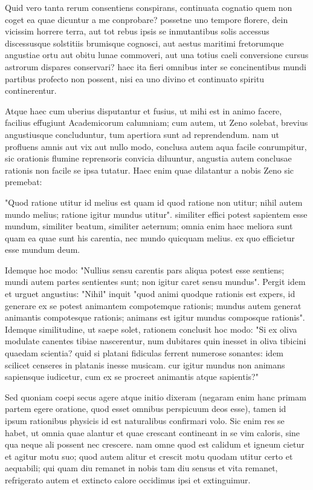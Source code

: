  Quid vero tanta rerum consentiens conspirans, continuata cognatio quem non coget ea quae dicuntur a me conprobare? possetne uno tempore florere, dein vicissim horrere terra, aut tot rebus ipsis se inmutantibus solis accessus discessusque solstitiis brumisque cognosci, aut aestus maritimi fretorumque angustiae ortu aut obitu lunae commoveri, aut una totius caeli conversione cursus astrorum dispares conservari? haec ita fieri omnibus inter se concinentibus mundi partibus profecto non possent, nisi ea uno divino et continuato spiritu continerentur.

 Atque haec cum uberius disputantur et fusius, ut mihi est in animo facere, facilius effugiunt Academicorum calumniam; cum autem, ut Zeno solebat, brevius angustiusque concluduntur, tum apertiora sunt ad reprendendum. nam ut profluens amnis aut vix aut nullo modo, conclusa autem aqua facile conrumpitur, sic orationis flumine reprensoris convicia diluuntur, angustia autem conclusae rationis non facile se ipsa tutatur. Haec enim quae dilatantur a nobis Zeno sic premebat:

 "Quod ratione utitur id melius est quam id quod ratione non utitur; nihil autem mundo melius; ratione igitur mundus utitur". similiter effici potest sapientem esse mundum, similiter beatum, similiter aeternum; omnia enim haec meliora sunt quam ea quae sunt his carentia, nec mundo quicquam melius. ex quo efficietur esse mundum deum.

 Idemque hoc modo: "Nullius sensu carentis pars aliqua potest esse sentiens; mundi autem partes sentientes sunt; non igitur caret sensu mundus". Pergit idem et urguet angustius: "Nihil" inquit "quod animi quodque rationis est expers, id generare ex se potest animantem compotemque rationis; mundus autem generat animantis compotesque rationis; animans est igitur mundus composque rationis". Idemque similitudine, ut saepe solet, rationem conclusit hoc modo: "Si ex oliva modulate canentes tibiae nascerentur, num dubitares quin inesset in oliva tibicini quaedam scientia? quid si platani fidiculas ferrent numerose sonantes: idem scilicet censeres in platanis inesse musicam. cur igitur mundus non animans sapiensque iudicetur, cum ex se procreet animantis atque sapientis?"

 Sed quoniam coepi secus agere atque initio dixeram (negaram enim hanc primam partem egere oratione, quod esset omnibus perspicuum deos esse), tamen id ipsum rationibus physicis id est naturalibus confirmari volo. Sic enim res se habet, ut omnia quae alantur et quae crescant contineant in se vim caloris, sine qua neque ali possent nec crescere. nam omne quod est calidum et igneum cietur et agitur motu suo; quod autem alitur et crescit motu quodam utitur certo et aequabili; qui quam diu remanet in nobis tam diu sensus et vita remanet, refrigerato autem et extincto calore occidimus ipsi et extinguimur.

